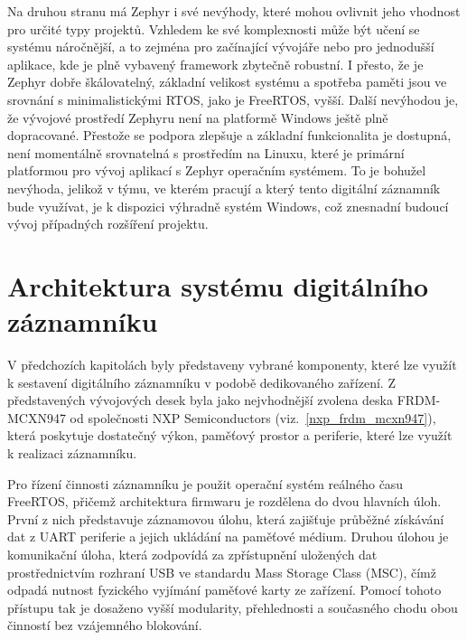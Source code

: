 Na druhou stranu má Zephyr i své nevýhody, které mohou ovlivnit jeho vhodnost pro určité typy projektů. Vzhledem ke své komplexnosti může být učení se systému náročnější, a to zejména pro začínající vývojáře nebo pro jednodušší aplikace, kde je plně vybavený framework zbytečně robustní. I přesto, že je Zephyr dobře škálovatelný, základní velikost systému a spotřeba paměti jsou ve srovnání s minimalistickými RTOS, jako je FreeRTOS, vyšší. Další nevýhodou je, že vývojové prostředí Zephyru není na platformě Windows ještě plně dopracované. Přestože se podpora zlepšuje a základní funkcionalita je dostupná, není momentálně srovnatelná s prostředím na Linuxu, které je primární platformou pro vývoj aplikací s Zephyr operačním systémem. To je bohužel nevýhoda, jelikož v týmu, ve kterém pracují a který tento digitální záznamník bude využívat, je k dispozici výhradně systém Windows, což znesnadní budoucí vývoj případných rozšíření projektu. \cite{nabto_guide_zephyr_vs_freertos}



\section{Architektura systému digitálního záznamníku}
\label{architektura_systemu_digitalniho_zaznamniku}
V předchozích kapitolách byly představeny vybrané komponenty, které lze využít k sestavení digitálního záznamníku v podobě dedikovaného zařízení. Z představených vývojových desek byla jako nejvhodnější zvolena deska FRDM-MCXN947 od společnosti NXP Semiconductors (viz.~\ref{nxp_frdm_mcxn947}), která poskytuje dostatečný výkon, paměťový prostor a periferie, které lze využít k realizaci záznamníku.

Pro řízení činnosti záznamníku je použit operační systém reálného času FreeRTOS, přičemž architektura firmwaru je rozdělena do dvou hlavních úloh. První z nich představuje záznamovou úlohu, která zajišťuje průběžné získávání dat z UART periferie a jejich ukládání na paměťové médium. Druhou úlohou je komunikační úloha, která zodpovídá za zpřístupnění uložených dat prostřednictvím rozhraní USB ve standardu Mass Storage Class (MSC), čímž odpadá nutnost fyzického vyjímání paměťové karty ze zařízení. Pomocí tohoto přístupu tak je dosaženo vyšší modularity, přehlednosti a současného chodu obou činností bez vzájemného blokování.


